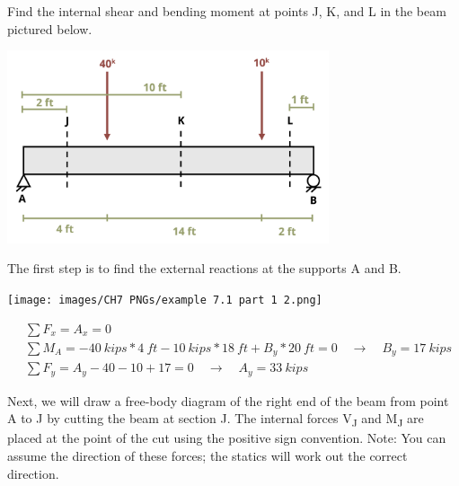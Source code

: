 \documentclass[
  letterpaper,
  DIV=11,
  numbers=noendperiod]{scrreprt}
\begin{document}
\begin{tcolorbox}[enhanced jigsaw, breakable, opacityback=0, toptitle=1mm, left=2mm, colback=white, opacitybacktitle=0.6, colframe=quarto-callout-tip-color-frame, titlerule=0mm, arc=.35mm, leftrule=.75mm, bottomtitle=1mm, colbacktitle=quarto-callout-tip-color!10!white, rightrule=.15mm, title={Example 7.1}, bottomrule=.15mm, toprule=.15mm, coltitle=black]

Find the internal shear and bending moment at points J, K, and L in the
beam pictured below.

\begin{center}
\includegraphics[width=3.72917in,height=\textheight]{images/CH7 PNGs/example 7.1 part 1.png}
\end{center}

\begin{tcolorbox}[enhanced jigsaw, breakable, opacityback=0, toptitle=1mm, left=2mm, colback=white, opacitybacktitle=0.6, colframe=quarto-callout-tip-color-frame, titlerule=0mm, arc=.35mm, leftrule=.75mm, bottomtitle=1mm, colbacktitle=quarto-callout-tip-color!10!white, rightrule=.15mm, title={Solution}, bottomrule=.15mm, toprule=.15mm, coltitle=black]

The first step is to find the external reactions at the supports A and
B.

\begin{center}
\texttt{[image: images/CH7 PNGs/example 7.1 part 1 2.png]}
\end{center}

\[
\begin{aligned}
& \sum F_x=A_x=0 \\
& \sum M_A=-40{~kips}*4{~ft}-10{~kips}*18{~ft}+B_y*20{~ft}=0 \quad\rightarrow\quad B_y=17{~kips} \\
& \sum F_y=A_y-40-10+17=0 \quad\rightarrow\quad A_y=33{~kips}
\end{aligned}
\]

Next, we will draw a free-body diagram of the right end of the beam from
point A to J by cutting the beam at section J. The internal forces
V\textsubscript{J} and M\textsubscript{J} are placed at the point of the
cut using the positive sign convention. Note: You can assume the
direction of these forces; the statics will work out the correct
direction.


\end{tcolorbox}
\end{tcolorbox}
\end{document}

